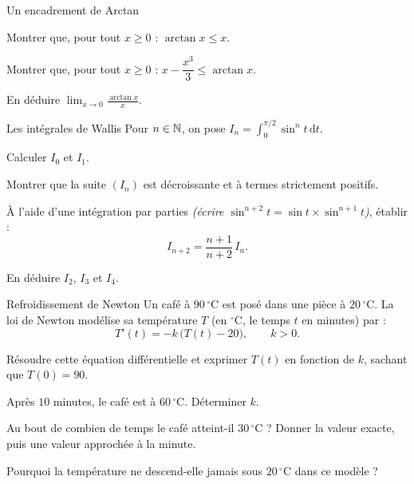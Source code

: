 \begin{exercice}[3]{Un encadrement de Arctan}
\begin{questions}
  \item Montrer que, pour tout $x\geq0$ : $\arctan x\leq x$.
  \item Montrer que, pour tout $x\geq0$ :
    $x-\dfrac{x^{3}}{3}\leq\arctan x$.
  \item En déduire $\displaystyle\lim_{x\to0}\frac{\arctan x}{x}$.
\end{questions}
\end{exercice}

\begin{exercice}[3]{Les intégrales de Wallis}
Pour $n\in\mathbb{N}$, on pose
$I_n=\displaystyle\int_{0}^{\pi/2}\sin^{n}t\,\mathrm{d}t$.
\begin{questions}
  \item Calculer $I_0$ et $I_1$.
  \item Montrer que la suite $(I_n)$ est décroissante et à termes
    strictement positifs.
  \item À l'aide d'une intégration par parties
    \emph{(écrire $\sin^{n+2}t=\sin t\times\sin^{n+1}t$)}, établir :
    \[
      I_{n+2}=\frac{n+1}{n+2}\,I_n.
    \]
  \item En déduire $I_2$, $I_3$ et $I_4$.
\end{questions}
\end{exercice}

\begin{exercice}[3]{Refroidissement de Newton}
Un café à $90\,^\circ$C est posé dans une pièce à $20\,^\circ$C. La loi de
Newton modélise sa température $T$ (en $^\circ$C, le temps $t$ en minutes)
par :
\[
  T'(t)=-k\,\bigl(T(t)-20\bigr),\qquad k>0.
\]
\begin{questions}
  \item Résoudre cette équation différentielle et exprimer $T(t)$ en
    fonction de $k$, sachant que $T(0)=90$.
  \item Après $10$ minutes, le café est à $60\,^\circ$C. Déterminer $k$.
  \item Au bout de combien de temps le café atteint-il $30\,^\circ$C ?
    Donner la valeur exacte, puis une valeur approchée à la minute.
  \item Pourquoi la température ne descend-elle jamais sous
    $20\,^\circ$C dans ce modèle ?
\end{questions}
\end{exercice}

